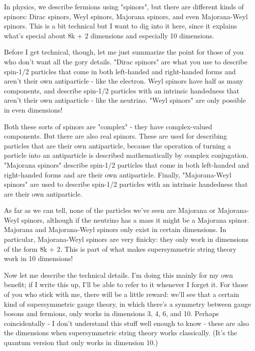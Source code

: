 In physics, we describe fermions using "spinors", but there are
different kinds of spinors: Dirac spinors, Weyl spinors, Majorana
spinors, and even Majorana-Weyl spinors.  This is a bit technical but
I want to dig into it here, since it explains what's special about
8k + 2 dimensions and especially 10 dimensions.  

Before I get technical, though, let me just summarize the point for 
those of you who don't want all the gory details.   "Dirac spinors"
are what you use to describe spin-1/2 particles that come in both
left-handed and right-handed forms and aren't their own antiparticle 
- like the electron.  Weyl spinors have half as many components,
and describe spin-1/2 particles with an intrinsic handedness that 
aren't their own antiparticle - like the neutrino.   "Weyl spinors"
are only possible in even dimensions!

Both these sorts of spinors are "complex" - they have complex-valued 
components.  But there are also real spinors.  These are used for describing 
particles that are their own antiparticle, because the operation of 
turning a particle into an antiparticle is described mathematically
by complex conjugation.  "Majorana spinors" describe spin-1/2 particles 
that come in both left-handed and right-handed forms and are their 
own antiparticle.  Finally, "Majorana-Weyl spinors" are used to describe 
spin-1/2 particles with an intrinsic handedness that are their own
antiparticle.  

As far as we can tell, none of the particles we've seen are Majorana
or Majorana-Weyl spinors, although if the neutrino has a mass it
might be a Majorana spinor.  Majorana and Majorana-Weyl spinors
only exist in certain dimensions.  In particular, Majorana-Weyl spinors
are very finicky: they only work in dimensions of the form 8k + 2.  
This is part of what makes supersymmetric string theory work in 10 
dimensions!

Now let me describe the technical details.  I'm doing this mainly
for my own benefit; if I write this up, I'll be able to refer to
it whenever I forget it.  For those of you who stick with me, there
will be a little reward: we'll see that a certain kind of supersymmetric 
gauge theory, in which there's a symmetry between gauge bosons and 
fermions, only works in dimensions 3, 4, 6, and 10.  Perhaps 
coincidentally - I don't understand this stuff well enough to know -
these are also the dimensions when supersymmetric string theory works
classically.  (It's the quantum version that only works in dimension 10.)

